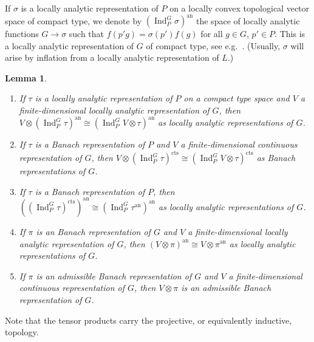 \documentclass[a4paper]{amsart}
\numberwithin{equation}{section}
\newtheorem{lem}[thm]{Lemma}
\theoremstyle{remark}
\theoremstyle{definition}
\DeclareMathOperator{\Ind}{Ind}
\newcommand{\an}{\mathrm{an}}
\newcommand{\cts}{\mathrm{cts}}
\begin{document}
If $\sigma$ is a locally analytic representation of $P$ on a locally convex topological vector space of compact type, we denote by $(\Ind_{P}^{G}\sigma)^{\an}$
the space of locally analytic functions $G\to \sigma$ such that $f(p'g) = \sigma(p')f(g)$ for all $g\in G$, $p'\in P$.
This is a locally analytic representation of $G$ of compact type, see e.g.\ \cite[\S2]{MR4190408}.
(Usually, $\sigma$ will arise by inflation from a locally analytic representation of $L$.)

\begin{lem}\label{lem:induction-tensor}\ 

  \begin{enumerate}
  \item If $\tau$ is a locally analytic representation of $P$ on a compact type space
    and $V$ a finite-dimensional locally analytic representation of $G$,
    then $V \otimes (\Ind_{P}^{G}\tau)^{\an} \cong (\Ind_{P}^{G}V \otimes \tau)^{\an}$ as locally analytic representations of $G$.
  \item If $\tau$ is a Banach representation of $P$
    and $V$ a finite-dimensional continuous representation of $G$,
    then $V \otimes (\Ind_{P}^{G}\tau)^{\cts} \cong (\Ind_{P}^{G}V \otimes \tau)^{\cts}$ as 
    Banach representations of $G$.
  \item If $\tau$ is a Banach representation of $P$,
    then $((\Ind_{P}^{G}\tau)^{\cts})^\an \cong (\Ind_{P}^{G}\tau^\an)^\an$
    as locally analytic representations of $G$.
  \item If $\pi$ is an Banach representation of $G$
    and $V$ a finite-dimensional locally analytic representation of $G$,
    then $(V \otimes \pi)^\an \cong V \otimes \pi^\an$ as locally analytic representations of $G$.
  \item If $\pi$ is an admissible Banach representation of $G$
    and $V$ a finite-dimensional continuous representation of $G$,
    then $V \otimes \pi$ is an admissible Banach representation of $G$.
  \end{enumerate}
\end{lem}

Note that the tensor products carry the projective, or equivalently inductive, topology.
\end{document}
